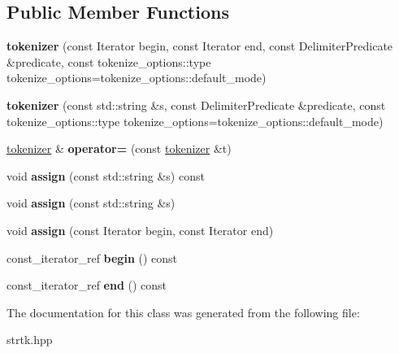 \subsection*{Public Member Functions}
\begin{DoxyCompactItemize}
\item 
\hypertarget{classstrtk_1_1tokenizer_a6f92edab67a4e1167067902a7908c90c}{{\bfseries tokenizer} (const Iterator begin, const Iterator end, const Delimiter\-Predicate \&predicate, const tokenize\-\_\-options\-::type tokenize\-\_\-options=tokenize\-\_\-options\-::default\-\_\-mode)}\label{classstrtk_1_1tokenizer_a6f92edab67a4e1167067902a7908c90c}

\item 
\hypertarget{classstrtk_1_1tokenizer_ab00092a6d7cb7fb93dd52090ccc71932}{{\bfseries tokenizer} (const std\-::string \&s, const Delimiter\-Predicate \&predicate, const tokenize\-\_\-options\-::type tokenize\-\_\-options=tokenize\-\_\-options\-::default\-\_\-mode)}\label{classstrtk_1_1tokenizer_ab00092a6d7cb7fb93dd52090ccc71932}

\item 
\hypertarget{classstrtk_1_1tokenizer_a9e592addb123865531f3f3ad50fad4dd}{\hyperlink{classstrtk_1_1tokenizer}{tokenizer} \& {\bfseries operator=} (const \hyperlink{classstrtk_1_1tokenizer}{tokenizer} \&t)}\label{classstrtk_1_1tokenizer_a9e592addb123865531f3f3ad50fad4dd}

\item 
\hypertarget{classstrtk_1_1tokenizer_a2c2363b99d1d453e86bdeb20104c9876}{void {\bfseries assign} (const std\-::string \&s) const }\label{classstrtk_1_1tokenizer_a2c2363b99d1d453e86bdeb20104c9876}

\item 
\hypertarget{classstrtk_1_1tokenizer_ad9efa1fa9b4becb70fedfeaec811d473}{void {\bfseries assign} (const std\-::string \&s)}\label{classstrtk_1_1tokenizer_ad9efa1fa9b4becb70fedfeaec811d473}

\item 
\hypertarget{classstrtk_1_1tokenizer_a1177083f1b97f4ae75dfebfe582f2b58}{void {\bfseries assign} (const Iterator begin, const Iterator end)}\label{classstrtk_1_1tokenizer_a1177083f1b97f4ae75dfebfe582f2b58}

\item 
\hypertarget{classstrtk_1_1tokenizer_a86ba0f1366434b1d7add642b303e3d58}{const\-\_\-iterator\-\_\-ref {\bfseries begin} () const }\label{classstrtk_1_1tokenizer_a86ba0f1366434b1d7add642b303e3d58}

\item 
\hypertarget{classstrtk_1_1tokenizer_ad32e0815f1d4da2f0466ca098afa6dc3}{const\-\_\-iterator\-\_\-ref {\bfseries end} () const }\label{classstrtk_1_1tokenizer_ad32e0815f1d4da2f0466ca098afa6dc3}

\end{DoxyCompactItemize}


The documentation for this class was generated from the following file\-:\begin{DoxyCompactItemize}
\item 
strtk.\-hpp\end{DoxyCompactItemize}
